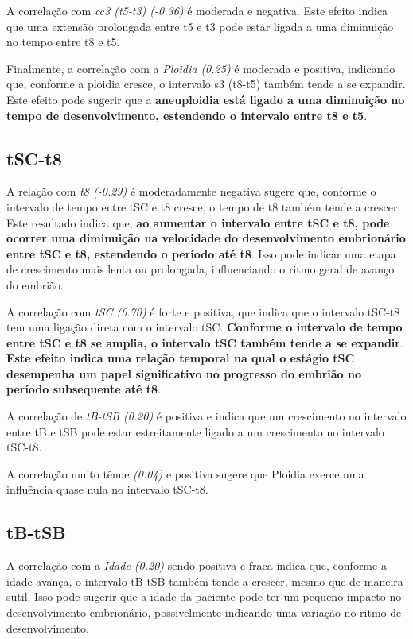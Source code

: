 A correlação com \textit{cc3 (t5-t3) (-0.36)} é moderada e negativa. Este efeito indica que uma extensão prolongada entre t5 e t3 pode estar ligada a uma diminuição no tempo entre t8 e t5.

Finalmente, a correlação com a \textit{Ploidia (0.25)} é moderada e positiva, indicando que, conforme a ploidia cresce, o intervalo s3 (t8-t5) também tende a se expandir. Este efeito pode sugerir que a \textbf{aneuploidia está ligado a uma diminuição no tempo de desenvolvimento, estendendo o intervalo entre t8 e t5}.

\subsection*{tSC-t8}
A relação com \textit{t8 (-0.29)} é moderadamente negativa sugere que, conforme o intervalo de tempo entre tSC e t8 cresce, o tempo de t8 também tende a crescer. Este resultado indica que,\textbf{ ao aumentar o intervalo entre tSC e t8, pode ocorrer uma diminuição na velocidade do desenvolvimento embrionário entre tSC e t8, estendendo o período até t8}. Isso pode indicar uma etapa de crescimento mais lenta ou prolongada, influenciando o ritmo geral de avanço do embrião.

A correlação com \textit{tSC (0.70)} é forte e positiva, que indica que o intervalo tSC-t8 tem uma ligação direta com o intervalo tSC. \textbf{Conforme o intervalo de tempo entre tSC e t8 se amplia, o intervalo tSC também tende a se expandir}. \textbf{Este efeito indica uma relação temporal na qual o estágio tSC desempenha um papel significativo no progresso do embrião no período subsequente até t8}.

A correlação de \textit{tB-tSB (0.20)} é positiva e indica que um crescimento no intervalo entre tB e tSB pode estar estreitamente ligado a um crescimento no intervalo tSC-t8. 

A correlação muito tênue \textit{(0.04)} e positiva sugere que Ploidia exerce uma influência quase nula no intervalo tSC-t8. 

\subsection*{tB-tSB}
A correlação com a \textit{Idade (0.20)} sendo positiva e fraca indica que, conforme a idade avança, o intervalo tB-tSB também tende a crescer, mesmo que de maneira sutil. Isso pode sugerir que a idade da paciente pode ter um pequeno impacto no desenvolvimento embrionário, possivelmente indicando uma variação no ritmo de desenvolvimento.

